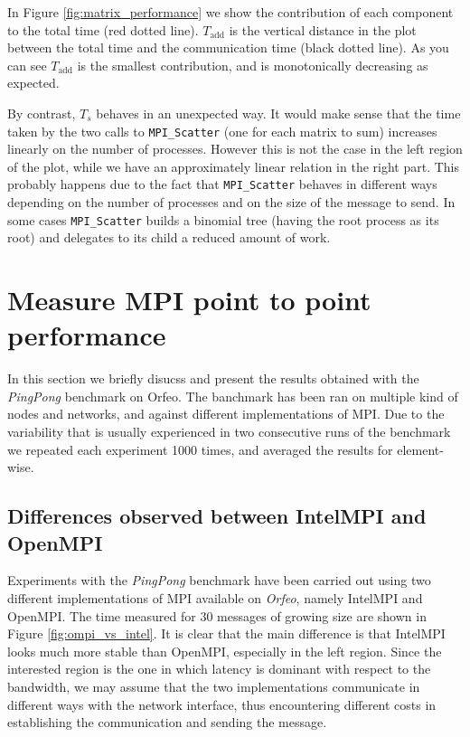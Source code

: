 \documentclass{article}
\begin{document}
In Figure \ref{fig:matrix_performance} we show the contribution of each component to the total time (red dotted line). $T_\text{add}$ is the vertical distance in the plot between the total time and the communication time (black dotted line). As you can see $T_\text{add}$ is the smallest contribution, and is monotonically decreasing as expected.

By contrast, $T_s$ behaves in an unexpected way. It would make sense that the time taken by the two calls to \texttt{MPI\_Scatter} (one for each matrix to sum) increases linearly on the number of processes. However this is not the case in the left region of the plot, while we have an approximately linear relation in the right part. This probably happens due to the fact that \texttt{MPI\_Scatter} behaves in different ways depending on the number of processes and on the size of the message to send. In some cases \texttt{MPI\_Scatter} builds a binomial tree (having the root process as its root) and delegates to its child a reduced amount of work.

\section{Measure MPI point to point performance}
In this section we briefly disucss and present the results obtained with the \emph{PingPong} benchmark on Orfeo. The banchmark has been ran on multiple kind of nodes and networks, and against different implementations of MPI. Due to the variability that is usually experienced in two consecutive runs of the benchmark we repeated each experiment 1000 times, and averaged the results for element-wise.

\subsection{Differences observed between IntelMPI and OpenMPI}
Experiments with the \emph{PingPong} benchmark have been carried out using two different implementations of MPI available on \emph{Orfeo}, namely IntelMPI and OpenMPI. The time measured for 30 messages of growing size are shown in Figure \ref{fig:ompi_vs_intel}. It is clear that the main difference is that IntelMPI looks much more stable than OpenMPI, especially in the left region. Since the interested region is the one in which latency is dominant with respect to the bandwidth, we may assume that the two implementations communicate in different ways with the network interface, thus encountering different costs in establishing the communication and sending the message.
\end{document}
